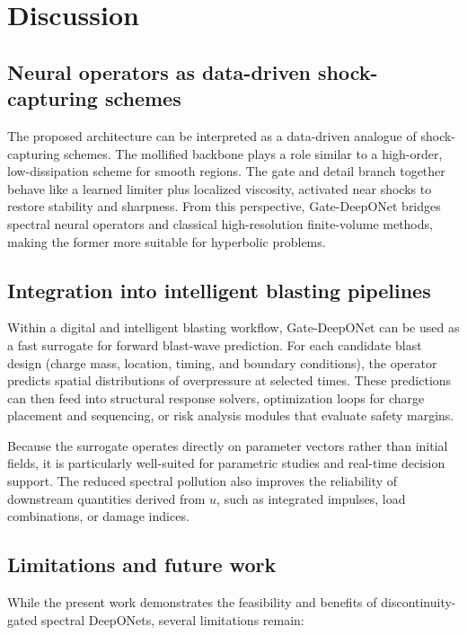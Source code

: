 \documentclass[a4paper,fleqn]{cas-dc}
\begin{document}
\section{Discussion}
\label{sec:discussion}

\subsection{Neural operators as data-driven shock-capturing schemes}

The proposed architecture can be interpreted as a data-driven analogue of shock-capturing schemes.
The mollified backbone plays a role similar to a high-order, low-dissipation scheme for smooth regions.
The gate and detail branch together behave like a learned limiter plus localized viscosity, activated near shocks to restore stability and sharpness.
From this perspective, Gate-DeepONet bridges spectral neural operators and classical high-resolution finite-volume methods, making the former more suitable for hyperbolic problems.

\subsection{Integration into intelligent blasting pipelines}

Within a digital and intelligent blasting workflow, Gate-DeepONet can be used as a fast surrogate for forward blast-wave prediction.
For each candidate blast design (charge mass, location, timing, and boundary conditions), the operator predicts spatial distributions of overpressure at selected times.
These predictions can then feed into structural response solvers, optimization loops for charge placement and sequencing, or risk analysis modules that evaluate safety margins.

Because the surrogate operates directly on parameter vectors rather than initial fields, it is particularly well-suited for parametric studies and real-time decision support.
The reduced spectral pollution also improves the reliability of downstream quantities derived from $u$, such as integrated impulses, load combinations, or damage indices.

\subsection{Limitations and future work}

While the present work demonstrates the feasibility and benefits of discontinuity-gated spectral DeepONets, several limitations remain:
\end{document}
